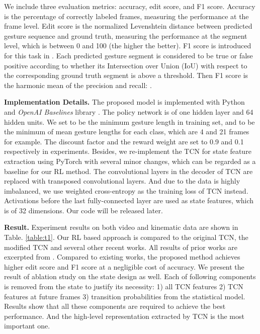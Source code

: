 \documentclass{llncs}
\begin{document}
We include three evaluation metrics: accuracy, edit score, and F1 score. Accuracy is the percentage of correctly labeled frames, measuring the performance at the frame level. Edit score is the normalized Levenshtein distance between predicted gesture sequence and ground truth, measuring the performance at the segment level, which is between 0 and 100 (the higher the better). F1 score is introduced for this task in \cite{Lea_2017_CVPR}. Each predicted gesture segment is considered to be true or false positive according to whether its Intersection over Union (IoU) with respect to the corresponding ground truth segment is above a threshold. Then F1 score is the harmonic mean of the precision and recall: .

\textbf{Implementation Details.} The proposed model is implemented with Python and {\itshape OpenAI Baselines} library \cite{baselines}. The policy network is of one hidden layer and 64 hidden units. We set  to be the minimum gesture length in training set, and  to be the minimum of mean gesture lengths for each class, which are 4 and 21 frames for example. The discount factor  and the reward weight  are set to 0.9 and 0.1 respectively in experiments. Besides, we re-implement the TCN for state feature extraction using PyTorch with several minor changes, which can be regarded as a baseline for our RL method. The convolutional layers in the decoder of TCN are replaced with transposed convolutional layers. And due to the data is highly imbalanced, we use weighted cross-entropy as the training loss of TCN instead. Activations before the last fully-connected layer are used as state features, which is of 32 dimensions. Our code will be released later.

\textbf{Result.} Experiment results on both video and kinematic data are shown in Table. \ref{table:t1}. Our RL based approach is compared to the original TCN, the modified TCN and several other recent works. All results of prior works are excerpted from \cite{lea2016temporal}. Compared to existing works, the proposed method achieves higher edit score and F1 score at a negligible cost of accuracy. We present the result of ablation study on the state design as well. Each of following components is removed from the state to justify its necessity: 1) all TCN features 2) TCN features at future frames 3) transition probabilities from the statistical model. Results show that all these components are required to achieve the best performance. And the high-level representation extracted by TCN is the most important one.
\end{document}
